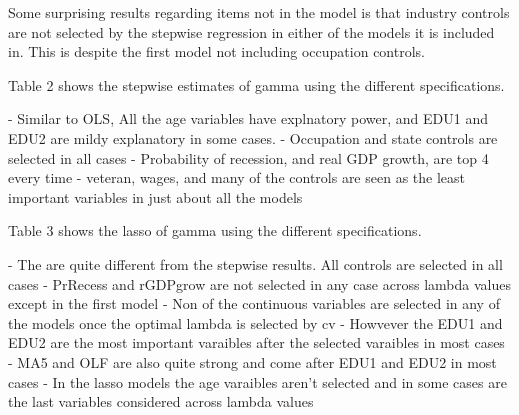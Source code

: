 \documentclass[12pt]{article}
\begin{document}
Some surprising results regarding items not in the model is that industry controls are not selected by the stepwise regression in either of the models it is included in. This is despite the first model not including occupation controls.


Table 2 shows the stepwise estimates of gamma using the different specifications. 

- Similar to OLS, All the age variables have explnatory power, and EDU1 and EDU2 are mildy explanatory in some cases.
- Occupation and state controls are selected in all cases
- Probability of recession, and real GDP growth, are top 4 every time
- veteran, wages, and many of the controls are seen as the least important variables in just about all the models  




Table 3 shows the lasso of gamma using the different specifications. 

- The are quite different from the stepwise results. All controls are selected in all cases
- PrRecess and rGDPgrow are not selected in any case across lambda values except in the first model
- Non of the continuous variables are selected in any of the models once the optimal lambda is selected by cv 
- Howvever the EDU1 and EDU2 are the most important varaibles after the selected varaibles in most cases
- MA5 and OLF are also quite strong and come after EDU1 and EDU2 in most cases
- In the lasso models the age varaibles aren't selected and in some cases are the last variables considered across lambda values

















\vspace{4cm}
\end{document}
